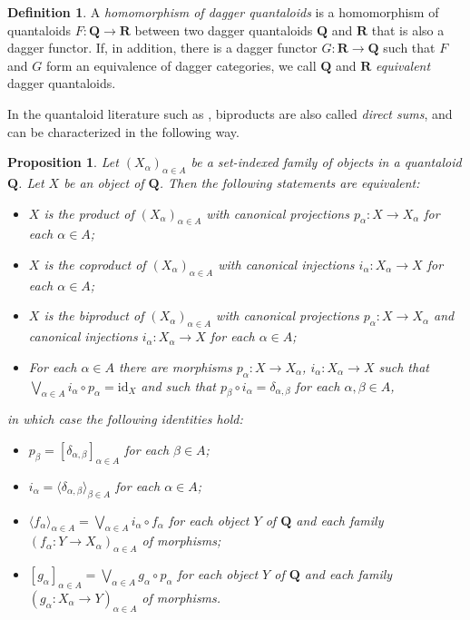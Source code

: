 \documentclass[12pt]{tac}
\newtheorem{proposition}[theorem]{Proposition}
\theoremstyle{definition}
\newtheorem{definition}[theorem]{Definition}
\theoremstyle{remark}
\newcommand{\<}{\langle}
\renewcommand{\>}{\rangle}
\renewcommand{\:}{\colon}
\newcommand{\id}{\mathrm{id}}
\begin{document}
\begin{definition}
    A \emph{homomorphism of dagger quantaloids} is a homomorphism of quantaloids $F:\mathbf Q\to\mathbf R$ between two dagger quantaloids $\mathbf Q$ and $\mathbf R$ that is also a dagger functor. If, in addition, there is a dagger functor $G:\mathbf R\to \mathbf Q$ such that $F$ and $G$ form an equivalence of dagger categories, we call $\mathbf Q$ and $\mathbf R$ \emph{equivalent} dagger quantaloids.
\end{definition}



In the quantaloid literature such as \cite{Stubbe}, biproducts are also called \emph{direct sums}, and can be characterized in the following way. 

\begin{proposition}\cite[Proposition 8.3]{Stubbe}\label{prop:biproducts in quantaloids}
Let $(X_\alpha)_{\alpha\in A}$ be a set-indexed family of objects in a quantaloid $\mathbf Q$. Let $X$ be an object of $\mathbf Q$. Then the following statements are equivalent:
    \begin{itemize}
        \item[(a)] $X$ is the product of $(X_\alpha)_{\alpha\in A}$ with canonical projections $p_\alpha:X\to X_\alpha$ for each $\alpha\in A$;
        \item[(b)] $X$ is the coproduct of $(X_\alpha)_{\alpha\in A}$ with canonical injections $i_\alpha:X_\alpha\to X$ for each $\alpha\in A$;
        \item[(c)] $X$ is the biproduct of $(X_\alpha)_{\alpha\in A}$ with canonical projections $p_\alpha:X\to X_\alpha$ and canonical injections $i_\alpha:X_\alpha\to X$ for each $\alpha\in A$;
        \item[(d)] For each $\alpha\in A$ there are morphisms $p_\alpha:X\to X_\alpha$, $i_\alpha:X_\alpha\to X$ such that 
        $\bigvee_{\alpha\in A}i_\alpha\circ p_\alpha=\id_X$ and such that $p_\beta\circ i_\alpha=\delta_{{\alpha},\beta}$ for each $\alpha,\beta\in A$,
    \end{itemize}
    in which case the following identities hold:
    \begin{itemize}
        \item $p_\beta=[\delta_{\alpha,\beta}]_{\alpha\in A}$ for each $\beta\in A$;
        \item $i_\alpha=\langle \delta_{\alpha,\beta}\rangle_{\beta\in A}$ for each $\alpha\in A$;
        \item $\langle f_\alpha\rangle_{\alpha\in A}=\bigvee_{\alpha\in A}i_\alpha\circ f_\alpha$ for each object $Y$ of $\mathbf Q$ and each family $(f_\alpha:Y\to X_\alpha)_{\alpha\in A}$ of morphisms;
        \item $[g_\alpha]_{\alpha\in A}=\bigvee_{\alpha\in A}g_\alpha\circ p_\alpha$ for each object $Y$ of $\mathbf Q$ and each family $(g_\alpha:X_\alpha\to Y)_{\alpha\in A}$ of morphisms. 
    \end{itemize}
   \end{proposition}
\end{document}
